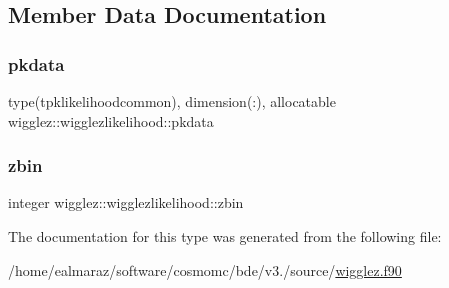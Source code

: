 \subsection{Member Data Documentation}
\mbox{\label{structwigglez_1_1wigglezlikelihood_a3a904305f0c18155693de2962fc99138}} 
\subsubsection{\texorpdfstring{pkdata}{pkdata}}
{\footnotesize\ttfamily type(tpklikelihoodcommon), dimension(\+:), allocatable wigglez\+::wigglezlikelihood\+::pkdata\hspace{0.3cm}{\ttfamily [private]}}

\mbox{\label{structwigglez_1_1wigglezlikelihood_af5847a12e9443164c0849f3895cf1a62}} 
\subsubsection{\texorpdfstring{zbin}{zbin}}
{\footnotesize\ttfamily integer wigglez\+::wigglezlikelihood\+::zbin\hspace{0.3cm}{\ttfamily [private]}}



The documentation for this type was generated from the following file\+:\begin{DoxyCompactItemize}
\item 
/home/ealmaraz/software/cosmomc/bde/v3./source/\mbox{\hyperlink{wigglez_8f90}{wigglez.\+f90}}\end{DoxyCompactItemize}
